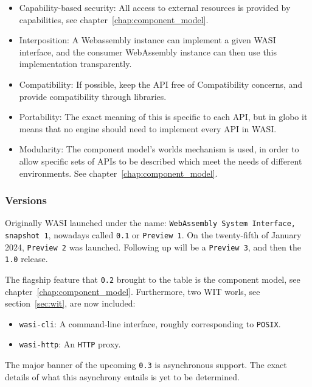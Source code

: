 \begin{itemize}
    \item Capability-based security: All access to external resources is provided by capabilities, see chapter~\ref{chap:component_model}.
    \item Interposition: A Webassembly instance can implement a given WASI interface, and the consumer WebAssembly instance can then use this implementation transparently.
    \item Compatibility: If possible, keep the \gls{API} free of Compatibility concerns, and provide compatibility through libraries.
    \item Portability: The exact meaning of this is specific to each \gls{API}, but in globo it means that no engine should need to implement every \gls{API} in \gls{WASI}.
    \item Modularity: The component model's worlds mechanism is used, in order to allow specific sets of APIs to be described which meet the needs of different environments. See chapter~\ref{chap:component_model}.
\end{itemize}



\subsubsection{Versions}
\label{sec:versions}

Originally \gls{WASI} launched under the name: \texttt{WebAssembly System Interface, snapshot 1}, nowadays called \texttt{0.1} or \texttt{Preview 1}. On the twenty-fifth of January 2024, \texttt{Preview 2} was launched. Following up will be a \texttt{Preview 3}, and then the \texttt{1.0} release.

The flagship feature that \texttt{0.2} brought to the table is the component model, see chapter~\ref{chap:component_model}. Furthermore, two \gls{WIT} worls, see section~\ref{sec:wit}, are now included:

\begin{itemize}
    \item \texttt{wasi-cli}: A command-line interface, roughly corresponding to \texttt{POSIX}.
    \item \texttt{wasi-http}: An \texttt{HTTP} proxy.
\end{itemize}

The major banner of the upcoming \texttt{0.3} is asynchronous support. The exact details of what this asynchrony entails is yet to be determined.

